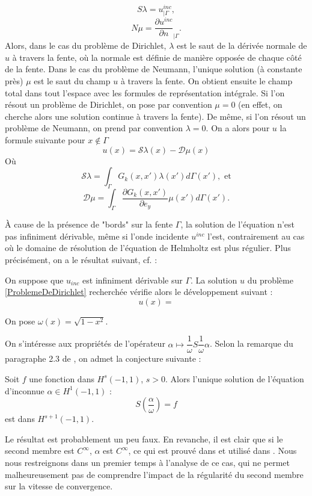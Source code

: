 \documentclass[11pt,a4paper]{article}
\begin{document}
\[ S\lambda = u^{inc}_{|\Gamma},\]
\[ N\mu = \frac{\partial u^{inc}}{\partial n}_{|\Gamma}.\]
Alors, dans le cas du problème de Dirichlet, $\lambda$ est le saut de la dérivée normale de $u$ à travers la fente, où la normale est définie de manière opposée de chaque côté de la fente. Dans le cas du problème de Neumann, l'unique solution (à constante près) $\mu$ est le saut du champ $u$ à travers la fente. On obtient ensuite le champ total dans tout l'espace avec les formules de représentation intégrale. Si l'on résout un problème de Dirichlet, on pose par convention $\mu = 0$ (en effet, on cherche alors une solution continue à travers la fente). De même, si l'on résout un problème de Neumann, on prend par convention $\lambda = 0$. On a alors pour $u$ la formule suivante pour $x \notin \Gamma$
\[u(x) = \mathcal{S}\lambda(x) - \mathcal{D}\mu(x)\]
Où 
\[\mathcal{S}\lambda = \int_{\Gamma}G_k(x,x') \lambda(x')d\Gamma(x'), \text{ et}\]
\[\mathcal{D}\mu = \int_{\Gamma} \frac{\partial{G_k(x,x')}}{\partial e_y} \mu(x')d\Gamma(x').\]

À cause de la présence de "bords" sur la fente $\Gamma$, la solution de l'équation n'est pas infiniment dérivable, même si l'onde incidente $u^{inc}$ l'est, contrairement au cas où le domaine de résolution de l'équation de Helmholtz est plus régulier. Plus précisément, on a le résultat suivant, cf. \cite{costabel2003asymptotics} : 
\begin{The} On suppose que $u_{inc}$ est infiniment dérivable sur $\Gamma$. La solution $u$ du problème \ref{ProblemeDeDirichlet} recherchée vérifie alors le développement suivant : 
\[ u(x) = \]
\end{The}


On pose $\omega(x)= \sqrt{1-x^2}$. 


On s'intéresse aux propriétés de l'opérateur $\alpha \mapsto \dfrac{1}{\omega} S \dfrac{1}{\omega}\alpha$. Selon la remarque du paragraphe 2.3 de \cite{bruno2012second}, on admet la conjecture suivante :
\begin{The} Soit $f$ une fonction dans $H^s(-1,1)$, $s>0$. Alors l'unique solution de l'équation d'inconnue $\alpha \in H^1(-1,1)$ :
\[S\left(\dfrac{\alpha}{\omega}\right) = f\]
est dans $H^{s+1}(-1,1)$. 
\end{The}

Le résultat est probablement un peu faux. En revanche, il est clair que si le second membre est $C^{\infty}$, $\alpha$ est $C^{\infty}$, ce qui est prouvé dans \cite{costabel2003asymptotics} et utilisé dans \cite{bruno2012second}. Nous nous restreignons dans un premier temps à l'analyse de ce cas, qui ne permet malheureusement pas de comprendre l'impact de la régularité du second membre sur la vitesse de convergence. 
\end{document}
